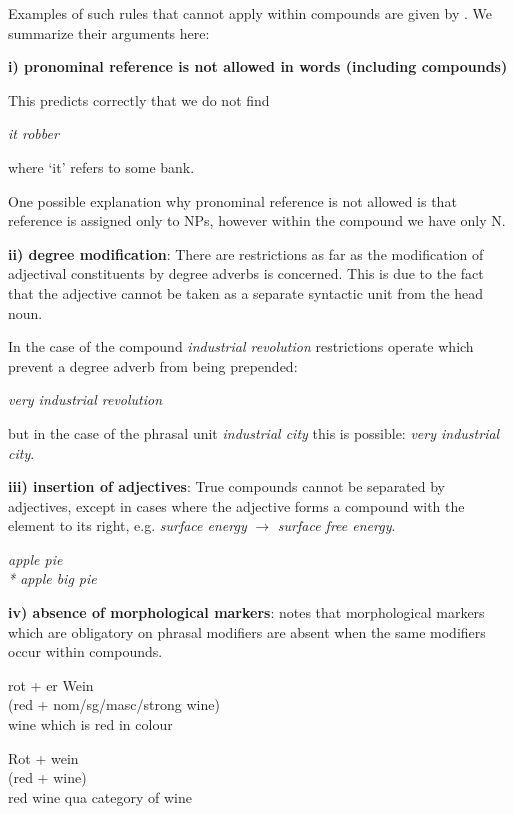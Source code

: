 Examples  of  such rules that cannot apply within  compounds  are 
given  by \cite[pp.~49--52]{DiSciullo87}.  We summarize their 
arguments here:

{\bf i) pronominal  reference  is  not allowed  in  words  (including     
compounds)}

\noindent
This predicts correctly that we do not find

\begin{center}
{\em * it robber}
\end{center}
\noindent
where  `it' refers to some bank.  

One  possible explanation why pronominal reference is not allowed 
is  that reference is assigned only to NPs,  however  within  the 
compound we have only N.

{\bf ii) degree modification}:
There  are restrictions as far as the modification of  adjectival 
constituents by degree adverbs is concerned.  This is due to  the 
fact  that the adjective cannot be taken as a separate  syntactic 
unit from the head noun.

\noindent
In the case of the compound
{\it industrial  revolution}  restrictions operate  which  prevent  a 
degree adverb from being prepended:
\begin{center}
{\em * very industrial revolution} 
\end{center}
\noindent
but  in  the case of the phrasal unit {\it industrial city}  this  is 
possible: {\it very industrial city}. 

{\bf iii) insertion of adjectives}:
True  compounds cannot be separated by 
adjectives,  except in cases where the adjective forms a compound 
with the element to its right,  e.g. {\it surface energy} $\rightarrow$ 
{\it surface 
free energy}.
\begin{center}
   {\em  apple pie \\
   * apple big pie\\}
\end{center}

{\bf iv) absence of morphological markers}:
\cite[p.~42]{Sproat92}  notes  that morphological  markers  which  are 
obligatory   on  phrasal  modifiers  are  absent  when  the  same 
modifiers occur within compounds.
\begin{enumerate}
{\em
\item       rot + er Wein \\
       (red + nom/sg/masc/strong wine)\\
       wine which is red in colour\\

\item    Rot + wein \\
       (red + wine)\\
        red wine qua category of wine\\}
\end{enumerate}


